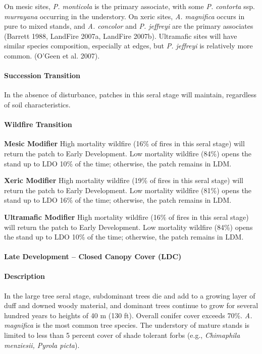 On mesic sites, \emph{P. monticola} is the primary associate, with some \emph{P. contorta} ssp. \emph{murrayana} occurring in the understory. On xeric sites, \emph{A. magnifica} occurs in pure to mixed stands, and \emph{A. concolor} and \emph{P. jeffreyi} are the primary associates (Barrett 1988, LandFire 2007a, LandFire 2007b). Ultramafic sites will have similar species composition, especially at edges, but \emph{P. jeffreyi} is relatively more common. (O'Geen et al. 2007).


\paragraph{Succession Transition} In the absence of disturbance, patches in this seral stage will maintain, regardless of soil characteristics.

\paragraph{Wildfire Transition}
\begin{adjustwidth}{2cm}{}
\noindent \textbf{Mesic Modifier } High mortality wildfire (16\% of fires in this seral stage) will return the patch to Early Development. Low mortality wildfire (84\%) opens the stand up to LDO 10\% of the time; otherwise, the patch remains in LDM. 

\medskip
\noindent \textbf{Xeric Modifier} High mortality wildfire (19\% of fires in this seral stage) will return the patch to Early Development. Low mortality wildfire (81\%) opens the stand up to LDO 16\% of the time; otherwise, the patch remains in LDM. 

\medskip
\noindent \textbf{Ultramafic Modifier} High mortality wildfire (16\% of fires in this seral stage) will return the patch to Early Development. Low mortality wildfire (84\%) opens the stand up to LDO 10\% of the time; otherwise, the patch remains in LDM.

\end{adjustwidth}

\noindent\hrulefill

\paragraph{Late Development – Closed Canopy Cover (LDC)}

\paragraph{Description} In the large tree seral stage, subdominant trees die and add to a growing layer of duff and downed woody material, and dominant trees continue to grow for several hundred years to heights of 40 m (130 ft). Overall conifer cover exceeds 70\%. \emph{A. magnifica} is the most common tree species. The understory of mature stands is limited to less than 5 percent cover of shade tolerant forbs (e.g., \emph{Chimaphila menziesii, Pyrola picta}). 

